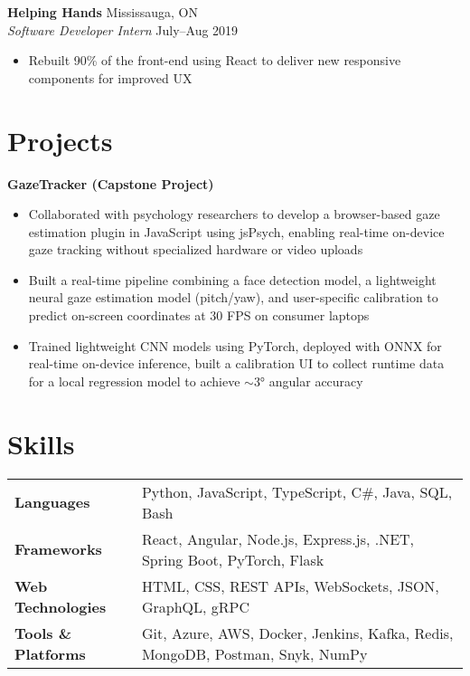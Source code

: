 \documentclass[a4paper,10pt]{article}
\begin{document}
\textbf{Helping Hands} \hfill Mississauga, ON \\
\textit{Software Developer Intern} \hfill July–Aug 2019
\begin{itemize}
    \item Rebuilt 90\% of the front-end using React to deliver new responsive components for improved UX
\end{itemize}

\section*{Projects}

\textbf{GazeTracker (Capstone Project)}
\begin{itemize}[itemsep=2pt]
    \item Collaborated with psychology researchers to develop a browser-based gaze estimation plugin in JavaScript using jsPsych, enabling real-time on-device gaze tracking without specialized hardware or video uploads
    \item Built a real-time pipeline combining a face detection model, a lightweight neural gaze estimation model (pitch/yaw), and user-specific calibration to predict on-screen coordinates at 30 FPS on consumer laptops
    \item Trained lightweight CNN models using PyTorch, deployed with ONNX for real-time on-device inference, built a calibration UI to collect runtime data for a local regression model to achieve $\sim$3° angular accuracy
\end{itemize}

\section*{Skills}

\begin{tabular}{ l l }
\textbf{Languages} & Python, JavaScript, TypeScript, C\#, Java, SQL, Bash \\
\textbf{Frameworks} & React, Angular, Node.js, Express.js, .NET, Spring Boot, PyTorch, Flask \\
\textbf{Web Technologies} & HTML, CSS, REST APIs, WebSockets, JSON, GraphQL, gRPC \\
\textbf{Tools \& Platforms} & Git, Azure, AWS, Docker, Jenkins, Kafka, Redis, MongoDB, Postman, Snyk, NumPy \\
\end{tabular}
\end{document}
